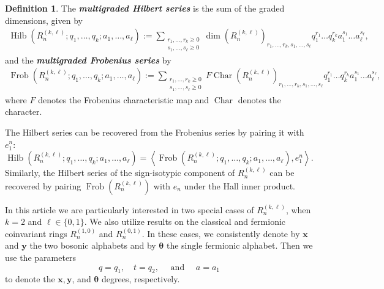 \documentclass[11pt, noadjust, reqno]{amsart}
\theoremstyle{definition}
\newtheorem{definition}[theorem]{Definition}
\theoremstyle{remark}
\numberwithin{equation}{section}
\newcommand{\0}{\emptyset}
\DeclareMathOperator{\Hilb}{Hilb}
\DeclareMathOperator{\Frob}{Frob}
\DeclareMathOperator{\Char}{Char}
\newcommand{\newword}[1]{\emph{\textbf{#1}}}
\begin{document}
\begin{definition}
The \newword{multigraded Hilbert series} is the sum of the graded dimensions, given by 
\begin{equation*}
\begin{aligned} 
\Hilb(R_n^{(k,\ell)}; q_1,\dots, q_k; a_1,\dots, a_\ell):= \sum_{\substack{r_1, \dots, r_k \geq 0\\ s_1,\dots,s_\ell \geq 0}}\dim \left(R_n^{(k,\ell)}\right)_{r_1,\dots,r_k, s_1,\dots,s_\ell}q_1^{r_1}\dots q_k^{r_k}a_1^{s_1}\dots a_\ell^{s_\ell},
\end{aligned}
\end{equation*}
and the \newword{multigraded Frobenius series} by 
\begin{equation*}
\begin{aligned} 
\Frob(R_n^{(k,\ell)}; q_1,\dots, q_k; a_1,\dots, a_\ell):= \sum_{\substack{r_1, \dots, r_k \geq 0\\ s_1,\dots,s_\ell \geq 0}} F\Char\left(R_n^{(k,\ell)}\right)_{r_1,\dots,r_k, s_1,\dots,s_\ell}q_1^{r_1}\dots q_k^{r_k}a_1^{s_1}\dots a_\ell^{s_\ell},
\end{aligned}
\end{equation*}
where $F$ denotes the Frobenius characteristic map and $\Char$ denotes the character.
\end{definition}

The Hilbert series can be recovered from the Frobenius series by pairing it with $e_1^n$:
\[
\Hilb(R_n^{(k,\ell)}; q_1,\dots, q_k; a_1,\dots, a_\ell)=\left\langle \Frob(R_n^{(k,\ell)}; q_1,\dots, q_k; a_1,\dots, a_\ell), e_1^n \right\rangle .\]
Similarly, the Hilbert series of the sign-isotypic component of $R_n^{(k,\ell)}$ can be recovered by pairing $\Frob(R_n^{(k,\ell)})$ with $e_n$ under the Hall inner product.

In this article we are particularly interested in two special cases of $R_n^{(k,\ell)}$, when $k=2$ and $\ell \in \{0,1\}$. We also utilize results on the classical and fermionic coinvariant rings $R_n^{(1,0)}$ and $R_n^{(0,1)}$. In these cases, we consistently denote by $\bm{x}$ and $\bm{y}$ the two bosonic alphabets and by $\bm{\theta}$ the single fermionic alphabet. 
Then we use the parameters 
\[q=q_1, \quad t=q_2, \quad \text{ and } \quad a=a_1\]
to denote the $\bm{x},\bm{y}$, and $\bm{\theta}$ degrees, respectively. 
\end{document}
